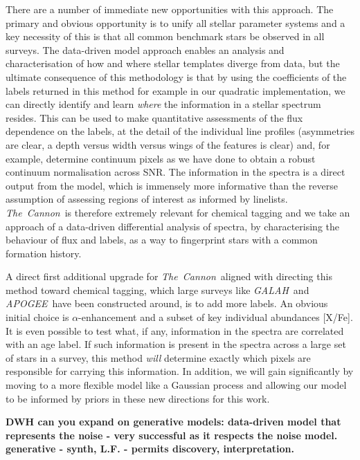 \documentclass[12pt, preprint]{aastex}
\newcommand{\tc}{\textsl{The~Cannon}}
\newcommand{\apogee}{\textsl{APOGEE}}
\newcommand{\galah}{\textsl{GALAH}}
\begin{document}


There are a number of immediate new opportunities with this approach. The primary and obvious opportunity is to unify all stellar parameter systems and a key necessity of this is that all common benchmark stars be observed in all surveys. The data-driven model approach enables an analysis and characterisation of how and where stellar templates diverge from data, but the ultimate consequence of this methodology is that by using the coefficients of the labels returned in this method for example in our quadratic implementation, we can directly identify and learn \textit{where} the information in a stellar spectrum resides. This can be used to make quantitative assessments of the flux dependence on the labels, at the detail of the individual line profiles (asymmetries are clear, a depth versus width versus wings of the features is clear) and, for example, determine continuum pixels as we have done to obtain a robust continuum normalisation across SNR. The information in the spectra  is a direct output from the model, which is immensely more informative than the reverse assumption of assessing regions of interest as informed by linelists.  \tc\ is therefore extremely relevant for chemical tagging and we take an approach of a data-driven differential analysis of spectra, by characterising the behaviour of flux and labels, as a way to fingerprint stars with a common formation history.

A direct first additional upgrade for \tc\ aligned with directing this method toward chemical tagging, which large surveys like \galah\ and \apogee\ have been constructed around,  is  to add more labels. An obvious initial choice is $\alpha$-enhancement and a subset of key individual abundances [X/Fe]. It is even possible to test what, if any, information in the spectra are correlated with an age label. If such information is present in the spectra across a large set of stars in a survey, this method \textit{will} determine exactly which pixels are responsible for carrying this information. In addition, we will gain significantly by moving to a more flexible model like a Gaussian process and allowing our model to be informed by priors in these new directions for this work. 


\textbf{DWH can you expand on generative models: data-driven model that represents the noise -  very successful as it respects the noise model. generative - synth, L.F. - permits discovery, interpretation.}
\end{document}
